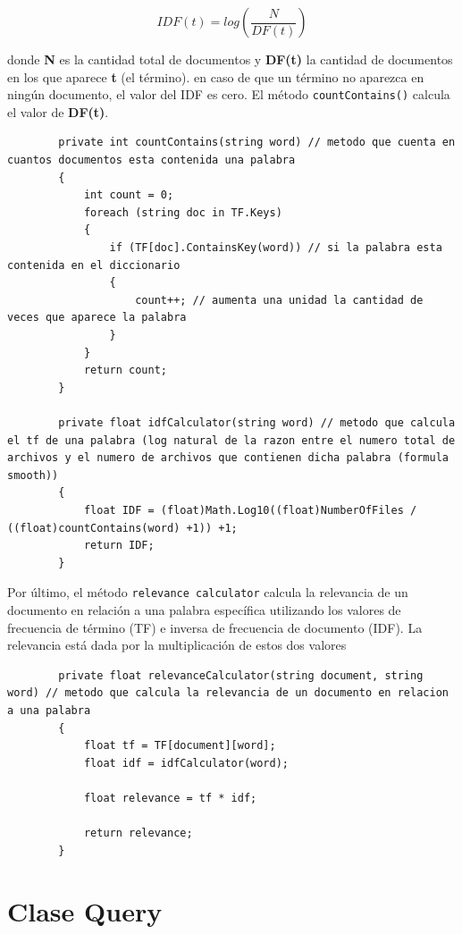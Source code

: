 \documentclass[12pt,a4paper]{report}
\begin{document}
$$IDF(t) = log(\frac{N}{DF(t)})$$ \bigskip

donde \textbf{N} es la cantidad total de documentos y \textbf{DF(t)} la cantidad de documentos en los que aparece \textbf{t} (el término). en caso de que un término no aparezca en ningún documento, el valor del IDF es cero. El método \texttt{countContains()} calcula el valor de \textbf{DF(t)}.\par

\begin{lstlisting}
        private int countContains(string word) // metodo que cuenta en cuantos documentos esta contenida una palabra
        {
            int count = 0;
            foreach (string doc in TF.Keys)
            {
                if (TF[doc].ContainsKey(word)) // si la palabra esta contenida en el diccionario
                {
                    count++; // aumenta una unidad la cantidad de veces que aparece la palabra
                }
            }
            return count;
        }

        private float idfCalculator(string word) // metodo que calcula el tf de una palabra (log natural de la razon entre el numero total de archivos y el numero de archivos que contienen dicha palabra (formula smooth))
        {
            float IDF = (float)Math.Log10((float)NumberOfFiles / ((float)countContains(word) +1)) +1;
            return IDF;
        }
\end{lstlisting}\bigskip

Por último, el método \texttt{relevance calculator} calcula la relevancia de un documento en relación a una palabra específica utilizando los valores de frecuencia de término (TF) e inversa de frecuencia de documento (IDF). La relevancia está dada por la multiplicación de estos dos valores

\begin{lstlisting}
        private float relevanceCalculator(string document, string word) // metodo que calcula la relevancia de un documento en relacion a una palabra
        {
            float tf = TF[document][word];
            float idf = idfCalculator(word);

            float relevance = tf * idf;

            return relevance;
        }
\end{lstlisting}

\chapter*{Clase Query}
\end{document}
